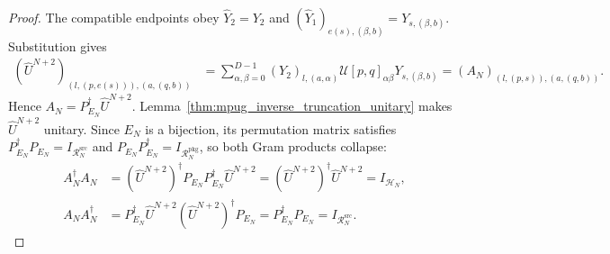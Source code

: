 \begin{proof}\leanok
    The compatible endpoints obey $\widehat Y_2=Y_2$ and
    $(\widehat Y_1)_{e(s),(\beta,b)}=Y_{s,(\beta,b)}$. Substitution gives
    \begin{align}
        (\widehat U^{N+2})_{(l,(p,e(s))),(a,(q,b))}
         & =\sum_{\alpha,\beta=0}^{D-1}(Y_2)_{l,(a,\alpha)}
        \mathcal U[p,q]_{\alpha\beta}Y_{s,(\beta,b)}
        =(A_N)_{(l,(p,s)),(a,(q,b))}.
    \end{align}
    Hence $A_N=P_{E_N}^\dagger\widehat U^{N+2}$.
    Lemma~\ref{thm:mpug_inverse_truncation_unitary} makes
    $\widehat U^{N+2}$ unitary. Since $E_N$ is a bijection, its permutation
    matrix satisfies $P_{E_N}^\dagger P_{E_N}=I_{\mathcal R_N^{\mathrm{src}}}$
    and $P_{E_N}P_{E_N}^\dagger=I_{\mathcal R_N^{\mathrm{pkg}}}$, so both Gram
    products collapse:
    \begin{align}
        A_N^\dagger A_N
         & =(\widehat U^{N+2})^\dagger P_{E_N}P_{E_N}^\dagger\widehat U^{N+2}
        =(\widehat U^{N+2})^\dagger\widehat U^{N+2}
        =I_{\mathcal H_N},                                                    \\
        A_NA_N^\dagger
         & =P_{E_N}^\dagger\widehat U^{N+2}(\widehat U^{N+2})^\dagger P_{E_N}
        =P_{E_N}^\dagger P_{E_N}
        =I_{\mathcal R_N^{\mathrm{src}}}.
    \end{align}
\end{proof}

